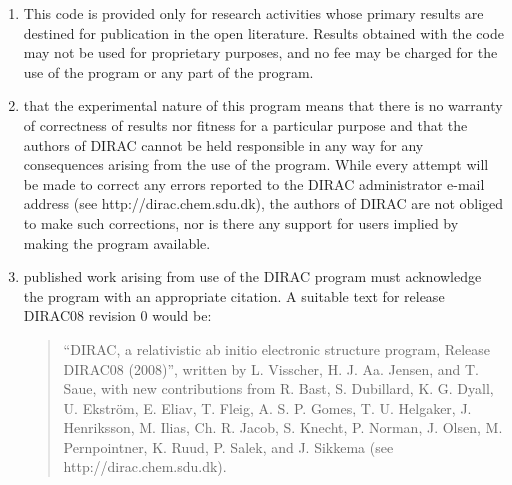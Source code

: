 \begin{enumerate}
\begin{enumerate}
\end{enumerate}

\item 
This code is provided only for research
activities whose primary results are destined for
publication in the open literature. Results obtained with the
code may not be used for proprietary purposes,
and no fee may be charged for the use
of the program or any part of the program.

\item 
{}
that the experimental nature of this program means that there
is no warranty of correctness of results
nor fitness for a particular purpose
and that the authors of DIRAC cannot
be held responsible in any way for any consequences
arising from the use of the program.
While every attempt will be made to correct any errors
reported to the DIRAC administrator e-mail address (see http://dirac.chem.sdu.dk),
the authors of DIRAC are not obliged to make such corrections,
nor is there any support for users implied by making the program available.

\item 
{}
published work arising
from use of the DIRAC program must
acknowledge the program with an appropriate
citation. A suitable text for release DIRAC08 revision 0 would be:

\begin{quote}
``DIRAC, a relativistic ab initio electronic structure program, Release DIRAC08 (2008)'',
written by L. Visscher, H. J. Aa. Jensen, and T. Saue,
with new contributions from R. Bast, S. Dubillard, K. G. Dyall,
U. Ekstr{\"o}m, E. Eliav, T. Fleig, A. S. P. Gomes, T. U. Helgaker,
J. Henriksson, M. Ilias, Ch. R. Jacob, S. Knecht, P. Norman,
J. Olsen, M. Pernpointner, K. Ruud, P. Salek, and J. Sikkema
(see http://dirac.chem.sdu.dk).
\end{quote}


\end{enumerate}

\clearpage

